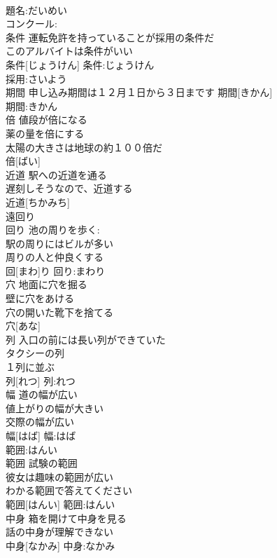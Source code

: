 \documentclass[8pt]{extreport}
\begin{document}
\begin{CJK}{UTF8}{min}
\\	題名:だいめい
\\	コンクール:
\\	条件	運転免許を持っていることが採用の条件だ 
\\	このアルバイトは条件がいい 
\\	条件[じょうけん]			条件:じょうけん
\\	採用:さいよう
\\	期間	申し込み期間は１２月１日から３日まです	期間[きかん]	
\\	期間:きかん
\\	倍	値段が倍になる 
\\	薬の量を倍にする 
\\	太陽の大きさは地球の約１００倍だ 
\\	倍[ばい]						
\\	近道	駅への近道を通る 
\\	遅刻しそうなので、近道する 
\\	近道[ちかみち]			
\\	遠回り 
\\	回り	池の周りを歩く: 
\\	駅の周りにはビルが多い 
\\	周りの人と仲良くする 
\\	回[まわ]り			回り:まわり
\\	穴	地面に穴を掘る 
\\	壁に穴をあける 
\\	穴の開いた靴下を捨てる 
\\	穴[あな]						
\\	列	入口の前には長い列ができていた 
\\	タクシーの列 
\\	１列に並ぶ 
\\	列[れつ]			列:れつ
\\	幅	道の幅が広い 
\\	値上がりの幅が大きい 
\\	交際の幅が広い 
\\	幅[はば]			幅:はば
\\	範囲:はんい
\\	範囲	試験の範囲 
\\	彼女は趣味の範囲が広い 
\\	わかる範囲で答えてください 
\\	範囲[はんい]			範囲:はんい
\\	中身	箱を開けて中身を見る 
\\	話の中身が理解できない 
\\	中身[なかみ]			中身:なかみ

\end{CJK}
\end{document}
